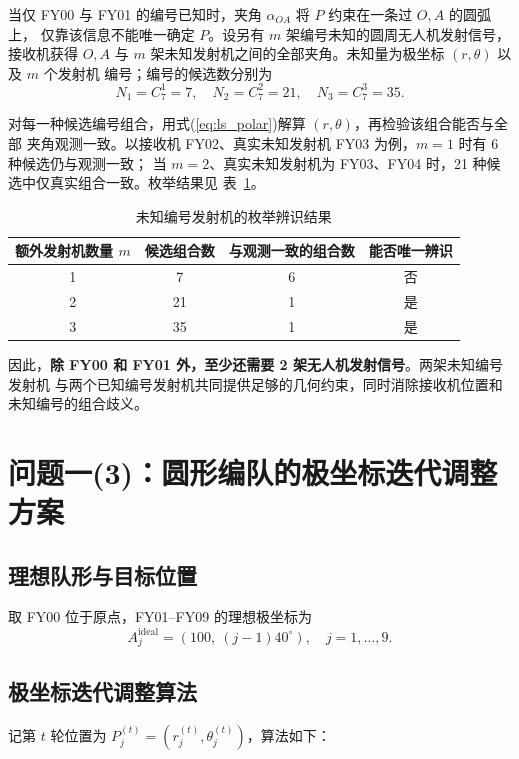 \documentclass[UTF8,a4paper,11pt]{ctexart}
\begin{document}
当仅 FY00 与 FY01 的编号已知时，夹角 $\alpha_{OA}$ 将 $P$ 约束在一条过 $O,A$ 的圆弧上，
仅靠该信息不能唯一确定 $P$。设另有 $m$ 架编号未知的圆周无人机发射信号，接收机获得
$O,A$ 与 $m$ 架未知发射机之间的全部夹角。未知量为极坐标 $(r,\theta)$ 以及 $m$ 个发射机
编号；编号的候选数分别为
\[
N_1=C_7^1=7,\quad N_2=C_7^2=21,\quad N_3=C_7^3=35.
\]

对每一种候选编号组合，用式(\ref{eq:ls_polar})解算 $(r,\theta)$，再检验该组合能否与全部
夹角观测一致。以接收机 FY02、真实未知发射机 FY03 为例，$m=1$ 时有 6 种候选仍与观测一致；
当 $m=2$、真实未知发射机为 FY03、FY04 时，21 种候选中仅真实组合一致。枚举结果见
表~\ref{tab:q12}。

\begin{table}[H]
\centering
\caption{未知编号发射机的枚举辨识结果}
\label{tab:q12}
\begin{tabular}{cccc}
\toprule
额外发射机数量 $m$ & 候选组合数 & 与观测一致的组合数 & 能否唯一辨识 \\
\midrule
1 & 7 & 6 & 否 \\
2 & 21 & 1 & 是 \\
3 & 35 & 1 & 是 \\
\bottomrule
\end{tabular}
\end{table}

因此，\textbf{除 FY00 和 FY01 外，至少还需要 2 架无人机发射信号}。两架未知编号发射机
与两个已知编号发射机共同提供足够的几何约束，同时消除接收机位置和未知编号的组合歧义。

\section{问题一(3)：圆形编队的极坐标迭代调整方案}

\subsection{理想队形与目标位置}

取 FY00 位于原点，FY01--FY09 的理想极坐标为
\begin{equation}
A_j^{\mathrm{ideal}}
=
\left(100,\ (j-1)40^\circ\right),\quad j=1,\dots,9.
\end{equation}

\subsection{极坐标迭代调整算法}

记第 $t$ 轮位置为 $P_j^{(t)}=(r_j^{(t)},\theta_j^{(t)})$，算法如下：
\end{document}
